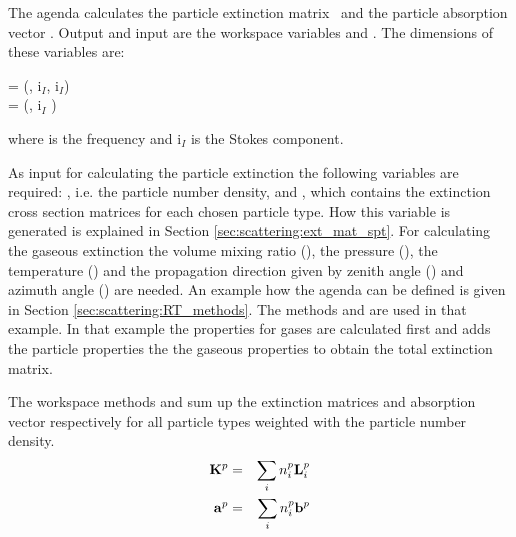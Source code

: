 \label{sec:scattering:opt_prop_part_agenda}

The agenda  calculates the particle
extinction matrix \ExtMat\ and the particle absorption vector \AbsVec
. Output and input are the workspace variables  and
.  The dimensions of these variables are:
\begin{center}
   = (\Frq, i$_I$, i$_I$)\\
   = (\Frq, i$_I$ )
\end{center}
where \Frq is the frequency and i$_I$ is the Stokes component.

As input for calculating the particle extinction the following
variables are required: , i.e. the particle
number density, and , which contains the
extinction cross section matrices for each chosen particle type. How
this variable is generated is explained in Section
\ref{sec:scattering:ext_mat_spt}. For calculating the gaseous
extinction the volume mixing ratio (), the pressure
(), the temperature () and the
propagation direction given by zenith angle
() and azimuth angle
() are needed. An example how the agenda can
be defined is given in Section \ref{sec:scattering:RT_methods}.  The
methods  and  are
used in that example. In that example the properties for gases are
calculated first and  adds the
particle properties the the gaseous properties to obtain the total
extinction matrix.

The workspace methods  and
 sum up the extinction matrices and
absorption vector respectively for all particle types weighted with
the particle number density. \begin{eqnarray}
  {\bf K}^{p} &=& \sum_i n^p_i {\bf L}^{p}_i\\
  {\bf a}^{p} &=& \sum_i n^p_i {\bf b}^{p}
\end{eqnarray}

\label{sec:scattering:ext_mat_spt}

